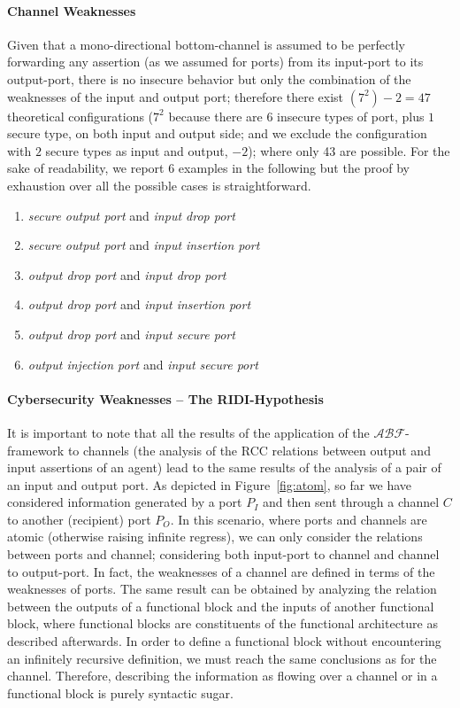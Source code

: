 \documentclass[conference]{IEEEtran}
\newcommand{\assertionRegion}{\mathcal{A}}
\newcommand{\beliefRegion}{\mathcal{B}}
\newcommand{\factRegion}{\mathcal{F}}
\newcommand{\abftheory}{\assertionRegion\beliefRegion\factRegion}
\newcommand{\Rcc}[2]{rcc(#1,#2)}
\begin{document}
\paragraph{Channel Weaknesses}
Given that a mono-directional bottom-channel is assumed to be perfectly
forwarding any assertion (as we assumed for ports) from its input-port to its
output-port, there is no insecure behavior but only the combination of the
weaknesses of the input and output port; therefore there exist $(7^2)-2=47$
theoretical configurations ($7^2$ because there are $6$ insecure types of port,
plus $1$ secure type, on both input and output side; and we exclude the
configuration with $2$ secure types as input and output, $-2$); where only 43
are possible. For the sake of readability, we report 6 examples in the
following but the proof by exhaustion over all the possible cases is
straightforward.

\begin{enumerate}[start=6, label={W\arabic*)}]
	\item \emph{secure output port} and \emph{input drop port}
	\item \emph{secure output port} and \emph{input insertion port}
	\item \emph{output drop port} and \emph{input drop port}
	\item \emph{output drop port} and \emph{input insertion port}
	\item \emph{output drop port} and \emph{input secure port}
	\item \emph{output injection port} and \emph{input secure port}
\end{enumerate}

\paragraph{Cybersecurity Weaknesses -- The RIDI-Hypothesis} 
It is important to note that all the results of the application of the
$\abftheory$-framework to channels (the analysis of the RCC relations
between output and input assertions of an agent)
lead to the same results of the
analysis of a pair of an input and output port.
As depicted in Figure~\ref{fig:atom}, so far we have
considered information generated by a port $P_I$ and then sent through a
channel $C$ to another (recipient) port $P_O$. In this scenario, where ports and
channels are atomic (otherwise raising infinite regress), we can only
consider the relations between ports and channel; considering both input-port
to channel and channel to output-port.  In fact, the weaknesses of a channel
are defined in terms of the weaknesses of ports.  
The same result can be obtained by analyzing the relation between the outputs
of a functional block and the inputs of another functional block, where
functional blocks are constituents of the functional architecture as described
afterwards.  In order to define a functional block without encountering an
infinitely recursive definition, we must reach the same conclusions as for the
channel. Therefore, describing the information as flowing over a channel or in
a functional block is purely syntactic sugar.
\end{document}

